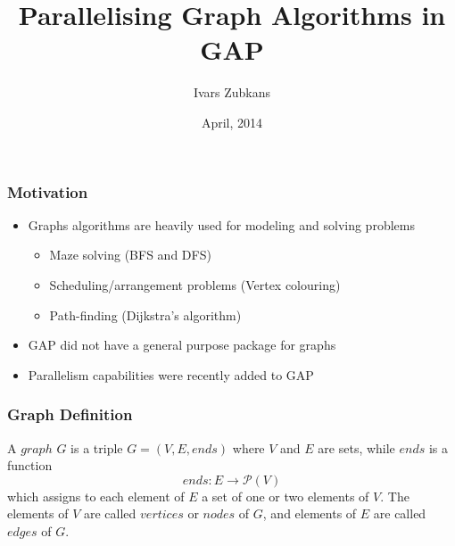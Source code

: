 \documentclass[18pt]{beamer}
\title{Parallelising Graph Algorithms in GAP}
\author{Ivars Zubkans}
\date{April, 2014}
\begin{document}

\frame{\titlepage}

\begin{frame}
	\frametitle{Motivation}
	
	\begin{itemize}
		\item Graphs algorithms are heavily used for modeling and solving problems
		\begin{itemize}
			\item Maze solving (BFS and DFS)
			\item Scheduling/arrangement problems (Vertex colouring)
			\item Path-finding (Dijkstra's algorithm)
		\end{itemize}
		\item GAP did not have a general purpose package for graphs
		\item Parallelism capabilities were recently added to GAP
	\end{itemize}
\end{frame}

\begin{frame}
	
	\frametitle{Graph Definition}
	
		\begin{definition}[Graph]
A $graph$  $G$ is a triple $G = (V, E, ends)$ where $V$ and $E$ are sets, while $ends$ is a function 
  \begin{equation}
  ends:E\to \mathcal P \left({V}\right)
  \end{equation}
which assigns to each element of $E$ a set of one or two elements of $V$. The elements of $V$ are called $vertices$ or $nodes$ of $G$, and elements of $E$ are called $edges$ of $G$.
\end{definition}
			
\end{frame}
	
\end{document}
